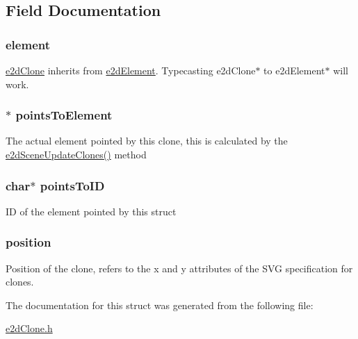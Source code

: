 \subsection{Field Documentation}
\hypertarget{structe2dClone_a55bc7a3a0af41fba9e5b91f390c5928c}{
\subsubsection[{element}]{ {\bf element}}}\label{structe2dClone_a55bc7a3a0af41fba9e5b91f390c5928c}
\hyperlink{structe2dClone}{e2d\-Clone} inherits from \hyperlink{structe2dElement}{e2d\-Element}. Typecasting e2d\-Clone$\ast$ to e2d\-Element$\ast$ will work. \hypertarget{structe2dClone_a237249b3b105a04b15b87304bba704a2}{
\subsubsection[{points\-To\-Element}]{$\ast$ {\bf points\-To\-Element}}}\label{structe2dClone_a237249b3b105a04b15b87304bba704a2}
The actual element pointed by this clone, this is calculated by the \hyperlink{group__e2dScene_gadfc497f7e653990ad03c4cd845eb8943}{e2d\-Scene\-Update\-Clones()} method \hypertarget{structe2dClone_a8e7bcbfdc0e0c94d13e02502f2c7ba01}{
\subsubsection[{points\-To\-I\-D}]{\setlength{\rightskip}{0pt plus 5cm}char$\ast$ {\bf points\-To\-I\-D}}}\label{structe2dClone_a8e7bcbfdc0e0c94d13e02502f2c7ba01}
I\-D of the element pointed by this struct \hypertarget{structe2dClone_afa8983f25fd6aa6aca18feb07d8d2249}{
\subsubsection[{position}]{ {\bf position}}}\label{structe2dClone_afa8983f25fd6aa6aca18feb07d8d2249}
Position of the clone, refers to the x and y attributes of the S\-V\-G specification for clones. 

The documentation for this struct was generated from the following file\-:\begin{DoxyCompactItemize}
\item 
\hyperlink{e2dClone_8h}{e2d\-Clone.\-h}\end{DoxyCompactItemize}
